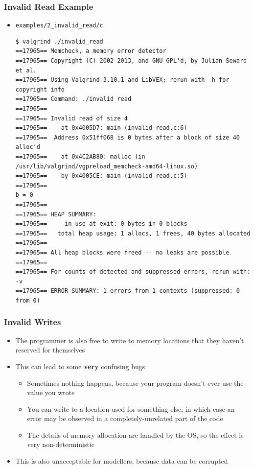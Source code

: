 \documentclass{beamer}
\begin{document}
\begin{frame}[fragile]
  \frametitle{Invalid Read Example}
  \begin{itemize}
    \item \texttt{examples/2\_invalid\_read/c}
      \begin{lstlisting}
$ valgrind ./invalid_read
==17965== Memcheck, a memory error detector
==17965== Copyright (C) 2002-2013, and GNU GPL'd, by Julian Seward et al.
==17965== Using Valgrind-3.10.1 and LibVEX; rerun with -h for copyright info
==17965== Command: ./invalid_read
==17965==
==17965== Invalid read of size 4
==17965==    at 0x4005D7: main (invalid_read.c:6)
==17965==  Address 0x51ff068 is 0 bytes after a block of size 40 alloc'd
==17965==    at 0x4C2AB80: malloc (in /usr/lib/valgrind/vgpreload_memcheck-amd64-linux.so)
==17965==    by 0x4005CE: main (invalid_read.c:5)
==17965==
b = 0
==17965==
==17965== HEAP SUMMARY:
==17965==     in use at exit: 0 bytes in 0 blocks
==17965==   total heap usage: 1 allocs, 1 frees, 40 bytes allocated
==17965==
==17965== All heap blocks were freed -- no leaks are possible
==17965==
==17965== For counts of detected and suppressed errors, rerun with: -v
==17965== ERROR SUMMARY: 1 errors from 1 contexts (suppressed: 0 from 0)
      \end{lstlisting}
  \end{itemize}
\end{frame}

\begin{frame}[fragile]
  \frametitle{Invalid Writes}
  \begin{itemize}
    \item The programmer is also free to write to memory locations that they haven't reserved for themselves
    \item This can lead to some {\bf very} confusing bugs
      \begin{itemize}
        \item Sometimes nothing happens, because your program doesn't ever use the value you wrote
          \item You can write to a location used for something else, in which case an error may be observed in a completely-unrelated part of the code
            \item The details of memory allocation are handled by the OS, so the effect is very non-deterministic
      \end{itemize}
      \item This is also unacceptable for modellers, because data can be corrupted
  \end{itemize}
\end{frame}
\end{document}
